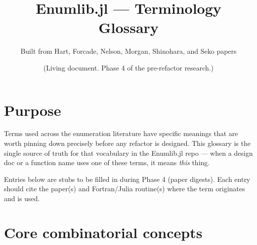 \documentclass[11pt]{article}
\title{Enumlib.jl --- Terminology Glossary}
\author{Built from Hart, Forcade, Nelson, Morgan, Shinohara, and Seko papers}
\date{(Living document. Phase 4 of the pre-refactor research.)}
\begin{document}
\maketitle

\section*{Purpose}

Terms used across the enumeration literature have specific meanings that
are worth pinning down precisely before any refactor is designed. This
glossary is the single source of truth for that vocabulary in the
Enumlib.jl repo --- when a design doc or a function name uses one of
these terms, it means \emph{this} thing.

Entries below are stubs to be filled in during Phase 4 (paper digests).
Each entry should cite the paper(s) and Fortran/Julia routine(s) where
the term originates and is used.

\section{Core combinatorial concepts}
\end{document}
